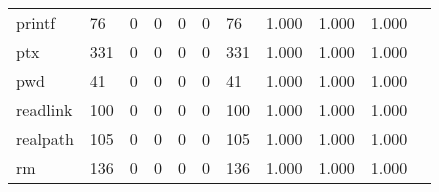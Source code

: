 \begin{longtable}{lp{1.2cm}p{1.2cm}p{1.2cm}p{1.2cm}p{1.2cm}p{1.2cm}p{1.2cm}p{1.2cm}p{1.2cm}p{1.2cm}}
printf    &                                    76 &                                                  0 &                                                  0 &                                                  0 &                                                  0 &                                                 76 &                                              1.000 &                                              1.000 &                                              1.000 \\
ptx       &                                   331 &                                                  0 &                                                  0 &                                                  0 &                                                  0 &                                                331 &                                              1.000 &                                              1.000 &                                              1.000 \\
pwd       &                                    41 &                                                  0 &                                                  0 &                                                  0 &                                                  0 &                                                 41 &                                              1.000 &                                              1.000 &                                              1.000 \\
readlink  &                                   100 &                                                  0 &                                                  0 &                                                  0 &                                                  0 &                                                100 &                                              1.000 &                                              1.000 &                                              1.000 \\
realpath  &                                   105 &                                                  0 &                                                  0 &                                                  0 &                                                  0 &                                                105 &                                              1.000 &                                              1.000 &                                              1.000 \\
rm        &                                   136 &                                                  0 &                                                  0 &                                                  0 &                                                  0 &                                                136 &                                              1.000 &                                              1.000 &                                              1.000 \\

\end{longtable}
